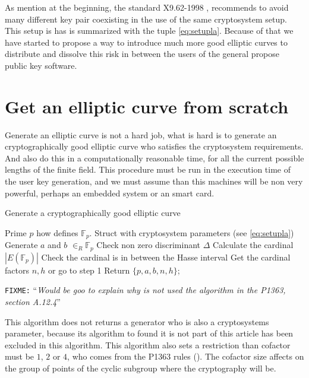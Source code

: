 \documentclass[10pt,a4paper,twoside]{llncs}
\newcommand{\fixme}[1]{\texttt{\color{red}FIXME:} ``\emph{#1}''}
\newcommand{\Fp}{\ensuremath{\mathbb{F}_p}}%
\begin{document}
As mention at the beginning, the standard X9.62-1998 \cite{X9.62-1998}, recommends to avoid many different key pair coexisting in the use of the same cryptosystem setup. This setup is has is summarized with the tuple \ref{eq:setupla}. Because of that we have started to propose a way to introduce much more good elliptic curves to distribute and dissolve this risk in between the users of the general propose public key software.

\section{Get an elliptic curve from scratch \label{sec:scratch}}

Generate an elliptic curve is not a hard job, what is hard is to generate an cryptographically good elliptic curve who satisfies the cryptosystem requirements. And also do this in a computationally reasonable time, for all the current possible lengths of the finite field. This procedure must be run in the execution time of the user key generation, and we must assume than this machines will be non very powerful, perhaps an embedded system or an smart card.


\begin{algorithm}
\caption{Generate a cryptographically good elliptic curve}\label{alg:scratch}
\begin{algorithmic}[1]
\REQUIRE Prime $p$ how defines \Fp.
\ENSURE Struct with cryptosystem parameters (see \ref{eq:setupla})
\REPEAT
\STATE Generate $a$ and $b$ $\in_{R}$\Fp
\STATE Check non zero discriminant $\Delta$
\STATE Calculate the cardinal $\left| E\left(\mathbb{F}_{p}\right)\right|$ %
\STATE Check the cardinal is in between the Hasse interval
\STATE Get the cardinal factors $n,h$ or go to step 1
\STATE Return $\{p,a,b,n,h\}$;
\end{algorithmic}
\end{algorithm}%

\fixme{Would be goo to explain why is not used the algorithm in the P1363, section A.12.4}

This algorithm does not returns a generator who is also a cryptosystems parameter, because its algorithm to found it is not part of this article has been excluded in this algorithm. This algorithm also sets a restriction than cofactor must be $1$, $2$ or $4$, who comes from the P1363 rules (\cite{P1363}). The cofactor size affects on the group of points of the cyclic subgroup where the cryptography will be.
\end{document}
